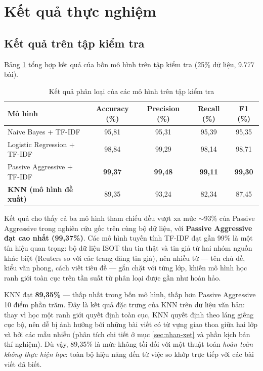 \section{Kết quả thực nghiệm}
\label{sec:kq-thuc-nghiem}

\subsection{Kết quả trên tập kiểm tra}

Bảng \ref{tab:ket-qua} tổng hợp kết quả của bốn mô hình trên tập kiểm tra (25\% dữ liệu, 9.777 bài).

\begin{table}[H]
\centering
\caption{Kết quả phân loại của các mô hình trên tập kiểm tra}
\label{tab:ket-qua}
\begin{tabular}{|l|c|c|c|c|}
\hline
\textbf{Mô hình} & \textbf{Accuracy (\%)} & \textbf{Precision (\%)} & \textbf{Recall (\%)} & \textbf{F1 (\%)} \\
\hline
Naive Bayes + TF-IDF & 95,81 & 95,31 & 95,39 & 95,35 \\
\hline
Logistic Regression + TF-IDF & 98,84 & 99,29 & 98,14 & 98,71 \\
\hline
Passive Aggressive + TF-IDF & \textbf{99,37} & \textbf{99,48} & \textbf{99,11} & \textbf{99,30} \\
\hline
\textbf{KNN (mô hình đề xuất)} & 89,35 & 93,24 & 82,34 & 87,45 \\
\hline
\end{tabular}
\end{table}

Kết quả cho thấy cả ba mô hình tham chiếu đều vượt xa mức $\sim$93\% của Passive Aggressive trong nghiên cứu gốc \cite{ahmed2017} trên cùng bộ dữ liệu, với \textbf{Passive Aggressive đạt cao nhất (99,37\%)}. Các mô hình tuyến tính TF-IDF đạt gần 99\% là một tín hiệu quan trọng: bộ dữ liệu ISOT thu tin thật và tin giả từ hai nhóm nguồn khác biệt (Reuters so với các trang đăng tin giả), nên nhiều từ --- tên chủ đề, kiểu văn phong, cách viết tiêu đề --- gắn chặt với từng lớp, khiến mô hình học ranh giới toàn cục trên tần suất từ phân loại được gần như hoàn hảo.

KNN đạt \textbf{89,35\%} --- thấp nhất trong bốn mô hình, thấp hơn Passive Aggressive 10 điểm phần trăm. Đây là kết quả đặc trưng của KNN trên dữ liệu văn bản: thay vì học một ranh giới quyết định toàn cục, KNN quyết định theo láng giềng cục bộ, nên dễ bị ảnh hưởng bởi những bài viết có từ vựng giao thoa giữa hai lớp và bởi các mẫu nhiễu (phân tích chi tiết ở mục \ref{sec:nhan-xet} và phần kịch bản thí nghiệm). Dù vậy, 89,35\% là mức không tồi đối với một thuật toán \textit{hoàn toàn không thực hiện học}: toàn bộ hiệu năng đến từ việc so khớp trực tiếp với các bài viết đã biết.

